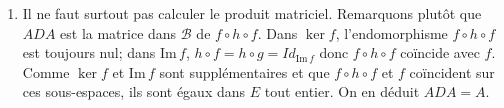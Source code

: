 \begin{enumerate}
\begin{enumerate}
\[\right. 
\]
\[
P^{-1}=\left( 
\begin{array}{cccc}
1 & 0 & 0 & 1 \\ 
0 & 1 & 0 & -1 \\ 
0 & 0 & 1 & -1 \\ 
\alpha  & 0 & 0 & 0
\end{array}
\right) \quad \quad P=\left( 
\begin{array}{cccc}
0 & 0 & 0 & \frac{1}{\alpha } \\ 
1 & 1 & 0 & -\frac{1}{\alpha } \\ 
1 & 0 & 1 & -\frac{1}{\alpha } \\ 
1 & 0 & 0 & -\frac{1}{\alpha }
\end{array}
\right) 
\]
\[
D=\underset{\mathcal{C}}{Mat}\,h=\frac{1}{\alpha ^{2}}\left( 
\begin{array}{cccc}
1 & 0 & 1 & -\frac{1}{\alpha } \\ 
-1 & 0 & -1 & \frac{\alpha ^{2}+1}{\alpha } \\ 
\alpha ^{2}-\alpha -1 & 1 & -\alpha -1 & \frac{-2\alpha ^{2}+\alpha +1}{
\alpha } \\ 
\alpha  & 0 & \alpha  & -1
\end{array}
\right) 
\]

\item Il ne faut surtout pas calculer le produit matriciel. Remarquons plut\^{o}t que $ADA$ est la matrice dans $\mathcal{B}$ de $f\circ h\circ f$.
Dans $\ker f$, l'endomorphisme $f\circ h\circ f$ est toujours nul; dans $%
\text{Im}\,f$, $h\circ f=h\circ g=Id_{\text{Im}\,f}$ donc $f\circ h\circ f$
co\"{i}ncide avec $f$. Comme $\ker f$ et $\text{Im}\,f$ sont
suppl\'{e}mentaires et que $f\circ h\circ f$ et $f$ co\"{i}ncident sur ces
sous-espaces, ils sont \'{e}gaux dans $E$ tout entier. On en d\'{e}duit $%
ADA=A$.
\end{enumerate}
\end{enumerate}
